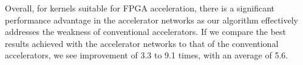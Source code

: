 \documentclass{sig-alternate}
\begin{document}
Overall, for kernels suitable for FPGA acceleration, there is a significant performance advantage in the accelerator networks as our algorithm effectively addresses the weakness of conventional accelerators. If we compare the best results achieved with the
accelerator networks to that of the conventional accelerators, we see improvement
of 3.3 to 9.1 times, with an average of 5.6. 





\end{document}
